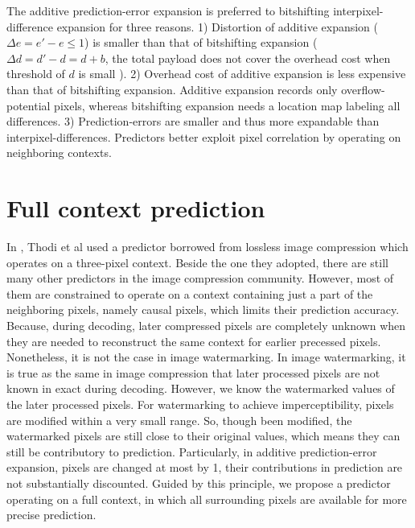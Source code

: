 \documentclass{article}
\begin{document}
The additive prediction-error expansion is preferred to bitshifting interpixel-difference expansion
for three reasons. 1) Distortion of additive expansion ($\Delta e=e'-e \le 1$) is smaller than that
of bitshifting expansion ($\Delta d=d'-d = d + b$, the total payload does not cover the overhead
cost when threshold of $d$ is small \cite{Chang07letter}). 2) Overhead cost of additive expansion is
less expensive than that of bitshifting expansion. Additive expansion records only
overflow-potential pixels, whereas bitshifting expansion needs a location map labeling all
differences. 3) Prediction-errors are smaller and thus more expandable than interpixel-differences.
Predictors better exploit pixel correlation by operating on neighboring contexts.

\section{Full context prediction} \label{sec:full}
In \cite{Thodi07pee}, Thodi et al used a predictor borrowed from lossless image compression which
operates on a three-pixel context. Beside the one they adopted, there are still many other
predictors in the image compression community. However, most of them are constrained to operate on a
context containing just a part of the neighboring pixels, namely causal pixels, which limits their
prediction accuracy. Because, during decoding, later compressed pixels are completely unknown when
they are needed to reconstruct the same context for earlier precessed pixels. Nonetheless, it is not
the case in image watermarking. In image watermarking, it is true as the same in image compression
that later processed pixels are not known in exact during decoding. However, we know the watermarked
values of the later processed pixels. For watermarking to achieve imperceptibility, pixels are
modified within a very small range. So, though been modified, the watermarked pixels are still close
to their original values, which means they can still be contributory to prediction. Particularly, in
additive prediction-error expansion, pixels are changed at most by 1, their contributions in
prediction are not substantially discounted. Guided by this principle, we propose a predictor
operating on a full context, in which all surrounding pixels are available for more precise
prediction.
\end{document}
